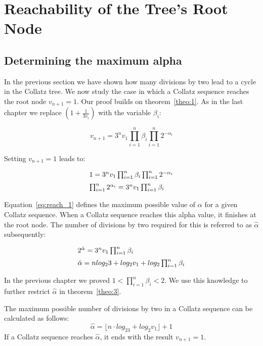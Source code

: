 \chapter{Reachability of the Tree's Root Node}

\section{Determining the maximum alpha}
In the previous section we have shown how many divisions by two lead to a cycle in the Collatz tree. We now study the case in which a Collatz sequence reaches the root node $v_{n+1}=1$. Our proof builds on theorem~\ref{theo:1}. As in the last chapter we replace $(1+\frac{1}{3v_i})$ with the variable $\beta_i$:

\[
v_{n+1}=3^nv_1\prod_{i=1}^{n}\beta_i\prod_{i=1}^{n}2^{-\alpha_i}
\]

Setting $v_{n+1}=1$ leads to:

\begin{equation}
\label{eq:reach_1}
\begin{array}{l}
1=3^nv_1\prod_{i=1}^{n}\beta_i\prod_{i=1}^{n}2^{-\alpha_i}
\\[\medskipamount]
\prod_{i=1}^{n}2^{\alpha_i}=3^nv_1\prod_{i=1}^{n}\beta_i
\end{array}	
\end{equation}

\par\medskip
Equation~\ref{eq:reach_1} defines the maximum possible value of $\alpha$ for a given Collatz sequence. When a Collatz sequence reaches this alpha value, it finishes at the root node. The number of divisions by two required for this is referred to as $\hat\alpha$ subsequently:

\begin{equation*}
\begin{array}{l}
2^{\hat\alpha}=3^nv_1\prod_{i=1}^{n}\beta_i
\\[\medskipamount]
\hat\alpha=nlog_23+log_2v_1+log_2\prod_{i=1}^{n}\beta_i
\end{array}	
\end{equation*}

\par\medskip
In the previous chapter we proved $1<\prod_{i=1}^{n}\beta_i<2$. We use this knowledge to further restrict $\hat\alpha$ in theorem~\ref{theo:3}.

\bigskip
\begin{theorem}
\label{theo:3}
The maximum possible number of divisions by two in a Collatz sequence can be calculated as follows:
\[
\hat\alpha=\lfloor n\cdot log_23+log_2v_1\rfloor+1
\]
If a Collatz sequence reaches $\hat\alpha$, it ends with the result $v_{n+1}=1$.
\end{theorem}

